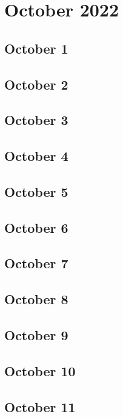 \chapter{October 2022}

\section{October 1}

\section{October 2}

\section{October 3}

\section{October 4}

\section{October 5}

\section{October 6}

\section{October 7}

\section{October 8}

\section{October 9}

\section{October 10}

\section{October 11}

